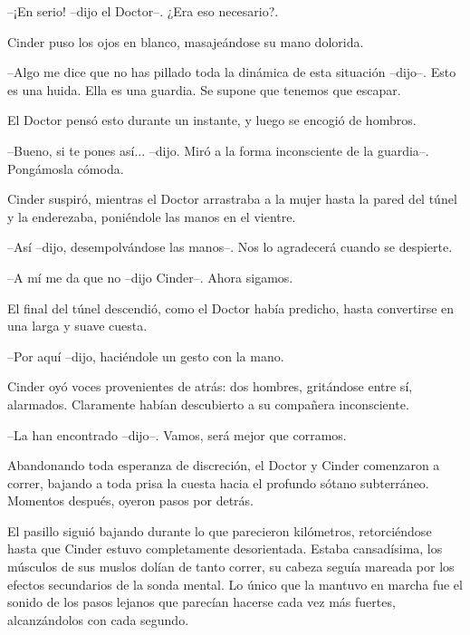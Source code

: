 --¡En serio! --dijo el Doctor--. ¿Era eso necesario?.



Cinder puso los ojos en blanco, masajeándose su mano dolorida.



--Algo me dice que no has pillado toda la dinámica de esta situación --dijo--. Esto es una huida. Ella es una guardia. Se supone que tenemos que escapar.



El Doctor pensó esto durante un instante, y luego se encogió de hombros.



--Bueno, si te pones así... --dijo. Miró a la forma inconsciente de la guardia--. Pongámosla cómoda.



Cinder suspiró, mientras el Doctor arrastraba a la mujer hasta la pared del túnel y la enderezaba, poniéndole las manos en el vientre.



--Así --dijo, desempolvándose las manos--. Nos lo agradecerá cuando se despierte.



--A mí me da que no --dijo Cinder--. Ahora sigamos.



El final del túnel descendió, como el Doctor había predicho, hasta convertirse en una larga y suave cuesta. 



--Por aquí --dijo, haciéndole un gesto con la mano.

Cinder oyó voces provenientes de atrás: dos hombres, gritándose entre sí, alarmados. Claramente habían descubierto a su compañera inconsciente.



--La han encontrado --dijo--. Vamos, será mejor que corramos.



Abandonando toda esperanza de discreción, el Doctor y Cinder comenzaron a correr, bajando a toda prisa la cuesta hacia el profundo sótano subterráneo. Momentos después, oyeron pasos por detrás.

El pasillo siguió bajando durante lo que parecieron kilómetros, retorciéndose hasta que Cinder estuvo completamente desorientada. Estaba cansadísima, los músculos de sus muslos dolían de tanto correr, su cabeza seguía mareada por los efectos secundarios de la sonda mental. Lo único que la mantuvo en marcha fue el sonido de los pasos lejanos que parecían hacerse cada vez más fuertes, alcanzándolos con cada segundo.



